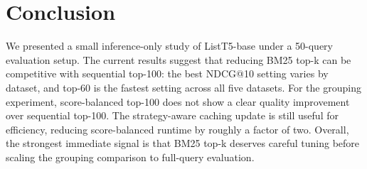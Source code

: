\section{Conclusion}
\label{sec:conclusion}

We presented a small inference-only study of ListT5-base under a 50-query evaluation setup.
The current results suggest that reducing BM25 top-k can be competitive with sequential top-100: the best NDCG@10 setting varies by dataset, and top-60 is the fastest setting across all five datasets.
For the grouping experiment, score-balanced top-100 does not show a clear quality improvement over sequential top-100. 
The strategy-aware caching update is still useful for efficiency, reducing score-balanced runtime by roughly a factor of two.
Overall, the strongest immediate signal is that BM25 top-k deserves careful tuning before scaling the grouping comparison to full-query evaluation.
